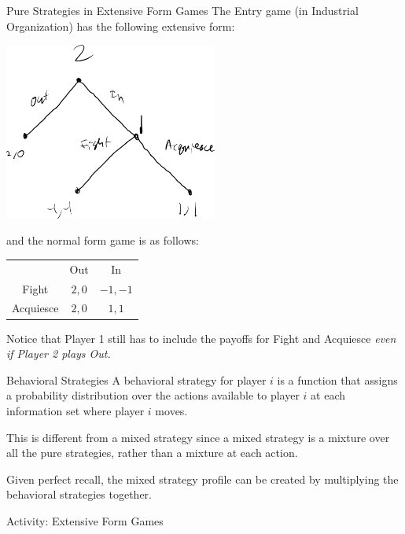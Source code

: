 \documentclass[8pt]{extarticle}
\begin{document}
\begin{problem}{Pure Strategies in Extensive Form Games}
    The Entry game (in Industrial Organization) has the following extensive form:
    \begin{center}
      \includegraphics[width=7cm]{images/entry_extensive.png}
    \end{center}
    and the normal form game is as follows:
    \begin{center}
      \renewcommand{\arraystretch}{1.5}
      \begin{tabular}{c|c|c|}
        \multicolumn{1}{c}{} & \multicolumn{1}{c}{Out} & \multicolumn{1}{c}{In}\\
        \cline{2-3}
        Fight & $2,0$ & $-1,-1$\\
        \cline{2-3}
        Acquiesce & $2,0$ & $1,1$\\
        \cline{2-3}
      \end{tabular}
    \end{center}
    Notice that Player 1 still has to include the payoffs for Fight and Acquiesce \textit{even if Player 2 plays Out.}
  \end{problem}
  \begin{problem}{Behavioral Strategies}
    A behavioral strategy for player $i$ is a function that assigns a probability distribution over the actions available to player $i$ at each information set where player $i$ moves.\newline
    
    This is different from a mixed strategy since a mixed strategy is a mixture over all the pure strategies, rather than a mixture at each action.\newline

    Given perfect recall, the mixed strategy profile can be created by multiplying the behavioral strategies together.
  \end{problem}
  \begin{problem}{Activity: Extensive Form Games}
    \begin{tcbraster}[raster columns = 1,colframe = black!75!white,colback=white]
    \end{tcbraster}
  \end{problem}
\end{document}
